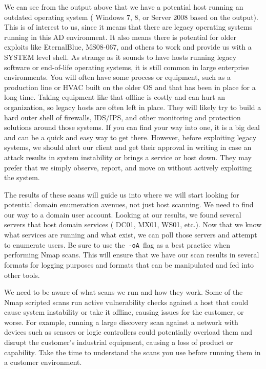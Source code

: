 We can see from the output above that we have a potential host running an outdated operating system ( Windows 7, 8, or Server 2008 based on the output). This is of interest to us, since it means that there are legacy operating systems running in this AD environment. It also means there is potential for older exploits like EternalBlue, MS08-067, and others to work and provide us with a SYSTEM level shell. As strange as it sounds to have hosts running legacy software or end-of-life operating systems, it is still common in large enterprise environments. You will often have some process or equipment, such as a production line or HVAC built on the older OS and that has been in place for a long time. Taking equipment like that offline is costly and can hurt an organization, so legacy hosts are often left in place. They will likely try to build a hard outer shell of firewalls, IDS/IPS, and other monitoring and protection solutions around those systems. If you can find your way into one, it is a big deal and can be a quick and easy way to get there. However, before exploiting legacy systems, we should alert our client and get their approval in writing in case an attack results in system instability or brings a service or host down. They may prefer that we simply observe, report, and move on without actively exploiting the system.

The results of these scans will guide us into where we will start looking for potential domain enumeration avenues, not just host scanning. We need to find our way to a domain user account. Looking at our results, we found several servers that host domain services ( DC01, MX01, WS01, etc.). Now that we know what services are running and what exist, we can poll those servers and attempt to enumerate users. Be sure to use the \verb|-oA| flag as a best practice when performing Nmap scans. This will ensure that we have our scan results in several formats for logging purposes and formats that can be manipulated and fed into other tools.

We need to be aware of what scans we run and how they work. Some of the Nmap scripted scans run active vulnerability checks against a host that could cause system instability or take it offline, causing issues for the customer, or worse. For example, running a large discovery scan against a network with devices such as sensors or logic controllers could potentially overload them and disrupt the customer's industrial equipment, causing a loss of product or capability. Take the time to understand the scans you use before running them in a customer environment.

